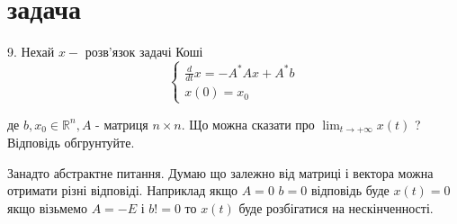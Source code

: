 
\section{задача}
\begin{tcolorbox}[title=Умова]
9. Нехай $x-$ розв'язок задачі Коші
$$
\left\{\begin{array}{l}
\frac{d}{d t} x=-A^* A x+A^* b \\
x(0)=x_0
\end{array}\right.
$$

де $b, x_0 \in \mathbb{R}^n, A$ - матриця $n \times n$. Що можна сказати про $\lim _{t \rightarrow+\infty} x(t)$ ? Відповідь обгрунтуйте.
\end{tcolorbox}


Занадто абстрактне питання. Думаю що залежно від матриці і вектора можна отримати різні відповіді. Наприклад якщо $A = 0$ $b = 0$ відповідь буде $x(t) = 0$ якщо візьмемо $A = -E$ і $b != 0$ то $x(t)$ буде розбігатися на нескінченності.
